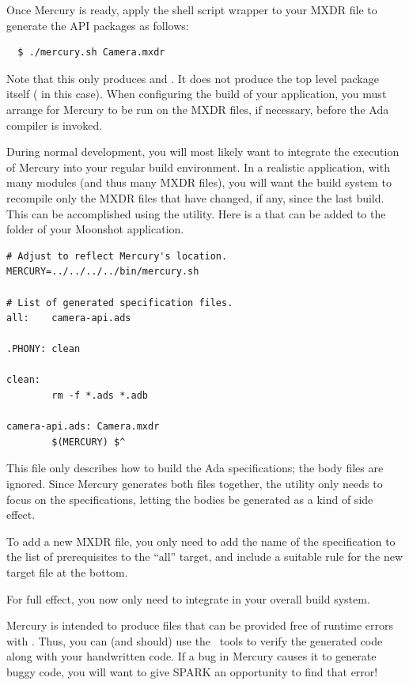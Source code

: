 Once Mercury is ready, apply the shell script wrapper to your MXDR file to generate the API
packages as follows:

\begin{verbatim}
  $ ./mercury.sh Camera.mxdr
\end{verbatim}

Note that this only produces  and . It does
not produce the top level package itself ( in this case). When configuring
the build of your application, you must arrange for Mercury to be run on the MXDR files, if
necessary, before the Ada compiler is invoked.

During normal development, you will most likely want to integrate the execution of Mercury
into your regular build environment. In a realistic application, with many modules (and thus
many MXDR files), you will want the build system to recompile only the MXDR files that have
changed, if any, since the last build. This can be accomplished using the 
utility. Here is a  that can be added to the  folder of
your Moonshot application.

\begin{verbatim}
# Adjust to reflect Mercury's location.
MERCURY=../../../../bin/mercury.sh
  
# List of generated specification files.
all:	camera-api.ads
  
.PHONY: clean
  
clean:
        rm -f *.ads *.adb
  
camera-api.ads:	Camera.mxdr
        $(MERCURY) $^  
\end{verbatim}

This file only describes how to build the Ada specifications; the body files are ignored. Since
Mercury generates both files together, the  utility only needs to focus on the
specifications, letting the bodies be generated as a kind of side effect.

To add a new MXDR file, you only need to add the name of the specification to the list of
prerequisites to the ``all'' target, and include a suitable rule for the new target file at the
bottom.

For full effect, you now only need to integrate  in your overall build system.

Mercury is intended to produce files that can be provided free of runtime errors with \SPARK.
Thus, you can (and should) use the \SPARK\ tools to verify the generated code along with your
handwritten code. If a bug in Mercury causes it to generate buggy code, you will want to give
SPARK an opportunity to find that error!

